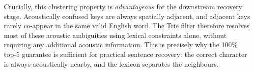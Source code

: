 \documentclass[conference]{IEEEtran}
\begin{document}
Crucially, this clustering property is \emph{advantageous} for the downstream recovery stage. Acoustically confused keys are always spatially adjacent, and adjacent keys rarely co-appear in the same valid English word. The Trie filter therefore resolves most of these acoustic ambiguities using lexical constraints alone, without requiring any additional acoustic information. This is precisely why the 100\% top-5 guarantee is sufficient for practical sentence recovery: the correct character is always acoustically nearby, and the lexicon separates the neighbours.




\end{document}
